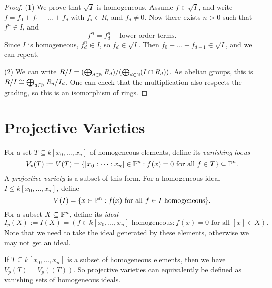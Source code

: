 \begin{proof}
  (1) We prove that $\sqrt{I}$ is
  homogeneous.
  Assume $f \in \sqrt{I}$, and write
  $f = f_0 + f_1 + \dots + f_d$ with
  $f_i \in R_i$ and $f_d \ne 0$. Now
  there exists $n > 0$ such that
  $f^n \in I$, and
  \[
    f^n = f^n_d + \text{lower order terms}.
  \]
  Since $I$ is homogeneous, $f_d^n \in I$,
  so $f_d \in \sqrt{I}$.
  Then $f_0 + \dots + f_{d - 1} \in \sqrt{I}$,
  and we can repeat.

  (2) We can write
  $R / I = (\bigoplus_{d \in \mathbb{N}} R_d) / (\bigoplus_{d \in \mathbb{N}} (I \cap R_d))$.
  As abelian groups, this is
  $R / I \cong \bigoplus_{d \in \mathbb{N}} R_d / I_d$.
  One can check that the multiplication
  also respects the grading, so
  this is an isomorphism of rings.
\end{proof}

\section{Projective Varieties}

\begin{definition}
  For a set $T \subseteq k[x_0, \dots, x_n]$ of
  homogeneous elements, define
  its \emph{vanishing locus}
  \[
    V_p(T) := V(T)
    = \{[x_0 : \dots : x_n] \in \mathbb{P}^n : f(x) = 0 \text{ for all } f \in T\}
    \subseteq \mathbb{P}^n.
  \]
  A \emph{projective variety}
  is a subset of this form.
  For a homogeneous ideal $I \le k[x_0, \dots, x_n]$,
  define
  \[
    V(I) = \{x \in \mathbb{P}^n : f(x) \text{ for all } f \in I \text{ homogeneous}\}.
  \]
  For a subset $X \subseteq \mathbb{P}^n$, define
  its \emph{ideal}
  \[
    I_p(X) := I(X)
    = ( f \in k[x_0, \dots, x_n] \text{ homogeneous} : f(x) = 0 \text{ for all } [x] \in X ).
  \]
  Note that we need to take the
  ideal generated by these
  elements, otherwise we may
  not get an ideal.
\end{definition}

\begin{remark}
  If $T \subseteq k[x_0, \dots, x_n]$
  is a subset of homogeneous elements,
  then we have $V_p(T) = V_p((T))$.
  So projective varieties can
  equivalently be defined as vanishing
  sets of homogeneous ideals.
\end{remark}

